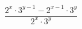 \begin{ex}[type=expression]
	\begin{condition}
		\( \dfrac{2^x\cdot3^{y-1}-2^{x-1}\cdot3^y}{2^x\cdot3^y} \)
	\end{condition}
\end{ex}